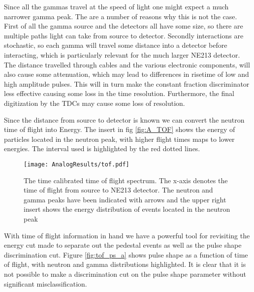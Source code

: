 \documentclass[main.tex]{subfiles}
\begin{document}
Since all the gammas travel at the speed of light one might expect a much narrower gamma peak. The are a number of reasons why this is not the case. First of all the gamma source and the detectors all have some size, so there are multiple paths light can take from source to detector. Secondly interactions are stochastic, so each gamma will travel some distance into a detector before interacting, which is particularly relevant for the much larger NE213 detector. The distance travelled through cables and the various electronic components, will also cause some attenuation, which may lead to differences in risetime of low and high amplitude pulses. This will in turn make the constant fraction discriminator less effective causing some loss in the time resolution. Furthermore, the final  digitization by the TDCs may cause some loss of resolution.

Since the distance from source to detector is known we can convert the neutron time of flight into Energy. The insert in fig \ref{fig:A_TOF} shows the energy of particles located in the neutron peak, with higher flight times maps to lower energies. The interval used is highlighted by the red dotted lines.
\begin{figure}[ht]
    \centering
        \texttt{[image: AnalogResults/tof.pdf]}
        \caption{The time calibrated time of flight spectrum. The x-axis denotes the time of flight from source to NE213 detector. The neutron and gamma peaks have been indicated with arrows and the upper right insert shows the energy distribution of events located in the neutron peak}
    \label{fig:tof_a}
\end{figure}

With time of flight information in hand we have a powerful tool for revisiting the energy cut made to separate out the pedestal events as well as the pulse shape discrimination cut. Figure \ref{fig:tof_ps_a} shows pulse shape as a function of time of flight, with neutron and gamma distributions highlighted. It is clear that it is not possible to make a discrimination cut on the pulse shape parameter without significant misclassification. 
\end{document}
